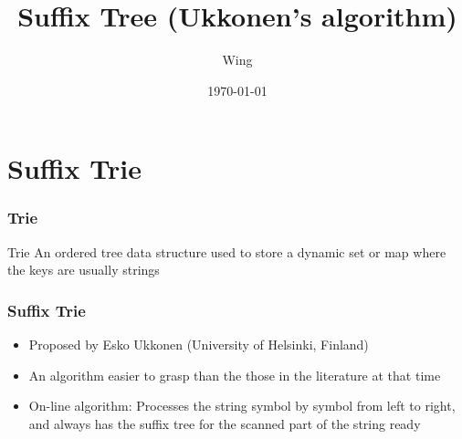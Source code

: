 \documentclass[compress,usenames,dvipsnames]{beamer}
\author{Wing}
\title{Suffix Tree (Ukkonen's algorithm)}
\begin{document}
\date{\today} 

\frame[plain]{\titlepage} %


\section{Suffix Trie}
\begin{frame} \frametitle{Trie}
    \begin{block}{Trie}
        An ordered tree data structure used to store a dynamic set or map where the keys are usually strings
    \end{block}
\end{frame}




























\begin{frame} \frametitle{Suffix Trie}
    \begin{itemize}
        \item Proposed by Esko Ukkonen (University of Helsinki, Finland)
        \item An algorithm easier to grasp than the those in the literature at that time
        \item On-line algorithm: Processes the string symbol by symbol from left to right, and always has the suffix tree for the scanned
            part of the string ready
    \end{itemize}
\end{frame}
\end{document}
